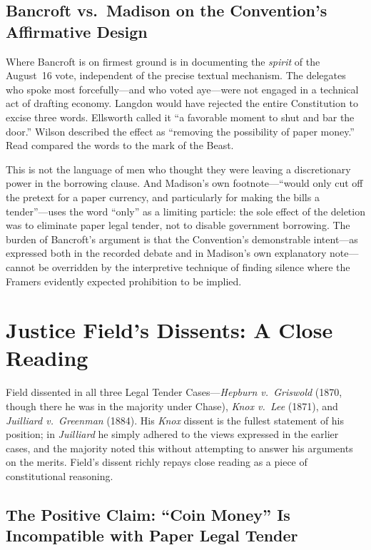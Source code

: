 \documentclass[12pt]{article}
\begin{document}
\subsection{Bancroft vs.\ Madison on the Convention's Affirmative Design}

Where Bancroft is on firmest ground is in documenting the \textit{spirit}
of the August~16 vote, independent of the precise textual mechanism.
The delegates who spoke most forcefully---and who voted aye---were not
engaged in a technical act of drafting economy. Langdon would have
rejected the entire Constitution to excise three words. Ellsworth
called it ``a favorable moment to shut and bar the door.'' Wilson
described the effect as ``removing the possibility of paper money.''
Read compared the words to the mark of the Beast.

This is not the language of men who thought they were leaving a
discretionary power in the borrowing clause. And Madison's own
footnote---``would only cut off the pretext for a paper currency,
and particularly for making the bills a tender''---uses the word
``only'' as a limiting particle: the sole effect of the deletion was
to eliminate paper legal tender, not to disable government borrowing.
The burden of Bancroft's argument is that the Convention's
demonstrable intent---as expressed both in the recorded debate and
in Madison's own explanatory note---cannot be overridden by the
interpretive technique of finding silence where the Framers evidently
expected prohibition to be implied.

\section{Justice Field's Dissents: A Close Reading}

Field dissented in all three Legal Tender Cases---\textit{Hepburn v.\
Griswold} (1870, though there he was in the majority under Chase),
\textit{Knox v.\ Lee} (1871), and \textit{Juilliard v.\ Greenman}
(1884). His \textit{Knox} dissent is the fullest statement of his
position; in \textit{Juilliard} he simply adhered to the views expressed
in the earlier cases, and the majority noted this without attempting
to answer his arguments on the merits. Field's dissent richly repays
close reading as a piece of constitutional reasoning.

\subsection{The Positive Claim: ``Coin Money'' Is Incompatible with
Paper Legal Tender}
\end{document}
